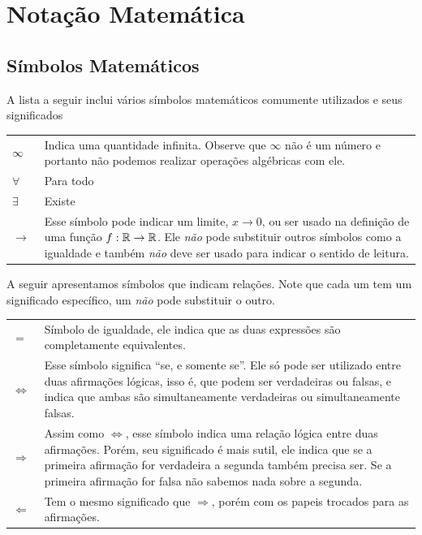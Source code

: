 \section{Notação Matemática}
\label{sec:Notacao_Matematica}

\subsection*{Símbolos Matemáticos}

A lista a seguir inclui vários símbolos matemáticos comumente utilizados e seus
significados

{\centering
\begin{tabular}{lp{15cm}}
  \emph{$\infty\;$} &
  Indica uma quantidade infinita. Observe que $\infty$ não é um número e portanto
  não podemos realizar operações algébricas com ele.
  \\
  \emph{$\forall\;$} &
  Para todo
  \\
  \emph{$\exists\;$} &
  Existe
  \\
  \emph{$\to\;$} &
  Esse símbolo pode indicar um limite, $x\to 0$, ou ser usado na definição de uma função
  $f:\mathbb{R}\to\mathbb{R}$. Ele \emph{não} pode substituir outros símbolos como a igualdade e também
  \emph{não} deve ser usado para indicar o sentido de leitura.
\end{tabular}\par}

A seguir apresentamos símbolos que indicam relações. Note que cada um tem um
significado específico, um \emph{não} pode substituir o outro.

{\centering
\begin{tabular}{lp{15cm}}
  \emph{$=\;$} &
  Símbolo de igualdade, ele indica que as duas expressões são completamente equivalentes.
  \\
  \emph{$\Leftrightarrow\;$} &
  Esse símbolo significa ``se, e somente se''.
  Ele só pode ser utilizado entre duas afirmações lógicas, isso é, que podem
  ser verdadeiras ou falsas, e indica que ambas são simultaneamente
  verdadeiras ou simultaneamente falsas.
  \\
  \emph{$\Rightarrow\;$} &
  Assim como $\Leftrightarrow$, esse símbolo indica uma relação lógica entre duas
  afirmações. Porém, seu significado é mais sutil, ele indica que se a primeira
  afirmação for verdadeira a segunda também precisa ser. Se a primeira afirmação
  for falsa não sabemos nada sobre a segunda.
  \\
  \emph{$\Leftarrow\;$} &
  Tem o mesmo significado que $\Rightarrow$, porém com os papeis trocados para as afirmações.
\end{tabular}\par}

